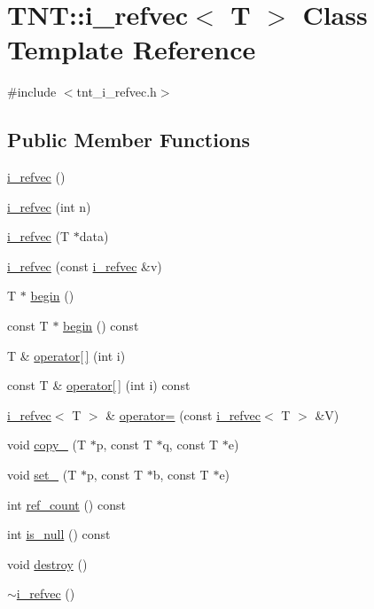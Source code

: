\hypertarget{classTNT_1_1i__refvec}{}\section{T\+NT\+:\+:i\+\_\+refvec$<$ T $>$ Class Template Reference}
\label{classTNT_1_1i__refvec}


{\ttfamily \#include $<$tnt\+\_\+i\+\_\+refvec.\+h$>$}

\subsection*{Public Member Functions}
\begin{DoxyCompactItemize}
\item 
\hyperlink{classTNT_1_1i__refvec_a83b19a5a8ae088c4996579f1f5e03578}{i\+\_\+refvec} ()
\item 
\hyperlink{classTNT_1_1i__refvec_af331cca09a3d6ec6ba51cff9fd4a3c1f}{i\+\_\+refvec} (int n)
\item 
\hyperlink{classTNT_1_1i__refvec_a53d5023955c537c1c2e112506c89714f}{i\+\_\+refvec} (T $\ast$data)
\item 
\hyperlink{classTNT_1_1i__refvec_af9b07aed8d397737c5bceada825b8ada}{i\+\_\+refvec} (const \hyperlink{classTNT_1_1i__refvec}{i\+\_\+refvec} \&v)
\item 
T $\ast$ \hyperlink{classTNT_1_1i__refvec_a254ea4b6909abc147991b0f3d58d77a7}{begin} ()
\item 
const T $\ast$ \hyperlink{classTNT_1_1i__refvec_ad804687b0ece34c37104629467cae2db}{begin} () const
\item 
T \& \hyperlink{classTNT_1_1i__refvec_ae72a1576302f9bbecd64cfc273c885c2}{operator\mbox{[}$\,$\mbox{]}} (int i)
\item 
const T \& \hyperlink{classTNT_1_1i__refvec_a9e3ce316bf77e4297206dff1122305ad}{operator\mbox{[}$\,$\mbox{]}} (int i) const
\item 
\hyperlink{classTNT_1_1i__refvec}{i\+\_\+refvec}$<$ T $>$ \& \hyperlink{classTNT_1_1i__refvec_a9957dd1544849ec1241fb9b7356daff0}{operator=} (const \hyperlink{classTNT_1_1i__refvec}{i\+\_\+refvec}$<$ T $>$ \&V)
\item 
void \hyperlink{classTNT_1_1i__refvec_ad8f94f1699e8f34dcfd7579be9121022}{copy\+\_\+} (T $\ast$p, const T $\ast$q, const T $\ast$e)
\item 
void \hyperlink{classTNT_1_1i__refvec_ae24b3e948c0f8052ac64cf70fe7805ad}{set\+\_\+} (T $\ast$p, const T $\ast$b, const T $\ast$e)
\item 
int \hyperlink{classTNT_1_1i__refvec_af2d6f32ba752f836bd08bcad0d0b72b6}{ref\+\_\+count} () const
\item 
int \hyperlink{classTNT_1_1i__refvec_af8d1a8ae488bd686ad6b563d6fc06e3a}{is\+\_\+null} () const
\item 
void \hyperlink{classTNT_1_1i__refvec_ae92db69e3b80c46a51a14d8403df4c15}{destroy} ()
\item 
\hyperlink{classTNT_1_1i__refvec_a4d43f30694d7ab2ce1a62331cff62279}{$\sim$i\+\_\+refvec} ()
\end{DoxyCompactItemize}

